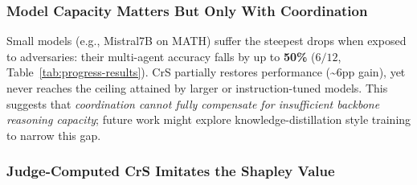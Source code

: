 \begin{table}[t]            %
  \small                    %
  \caption{Standalone Agent Architecture with LLaMA3.2(3B) agents. The table shows coordinator accuracy using credibility‑score (CrS) weights versus uniform weights across all tasks; numbers in parentheses indicate the resulting performance gap.}
  \label{tab:SAA}
  \vspace{-4mm}
\end{table}
\vspace{-1mm}
\subsubsection{Model Capacity Matters But Only With Coordination}
Small models (e.g., Mistral7B on MATH) suffer the steepest drops when exposed to adversaries: their multi-agent accuracy falls by up to \textbf{50\%} ($6/12$, Table~\ref{tab:progress-results}). CrS partially restores performance (\textasciitilde6pp gain), yet never reaches the ceiling attained by larger or instruction-tuned models. This suggests that \emph{coordination cannot fully compensate for insufficient backbone reasoning capacity}; future work might explore knowledge-distillation style training to narrow this gap.

\subsubsection{Judge-Computed CrS Imitates the Shapley Value }
\label{sec:exp:judge}

